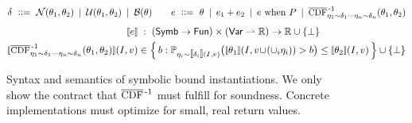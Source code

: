 \begin{figure}
  \EquationsFigureSize
  \begin{gather*}
    \delta \BnfDef \slnormal(\theta_1, \theta_2) \BnfOr \sluniform(\theta_1, \theta_2) \BnfOr \slbernouilli(\theta) \qquad
    e \BnfDef \theta \BnfOr e_1 + e_2 \BnfOr e \WhenSymbBE P  \BnfOr \InvCCDFwith{\eta_1 \sim \delta_1 \cdots \eta_n \sim \delta_n}(\theta_1, \theta_2) %
  \end{gather*}
  \begin{align*}
    \SymbBESem{e} &\aligncolon (\SymbsAll \to \Funs) \times (\VarsAll \parto \Reals) \to \OptReals \\
    \SymbBESem{\InvCCDFwith{\eta_1 \sim \delta_1 \cdots \eta_n \sim \delta_n}(\theta_1, \theta_2)}(I, v) &\in
       \Bigl\{\,b : \Prob_{\eta_i \sim \sem{\delta_i}(I, v)}\bigl(\sem{\theta_1}(I, v \!\CatValuation\! (\CatValuation_i \eta_i)) > b \bigr) \le \sem{\theta_2}(I,v)\,\Bigr\} \cup \{\OptNone\}
  \end{align*}
  \vspace{-0.4cm}
  \caption{Syntax and semantics of symbolic bound instantiations. We only show the contract that $\InvCCDF$ must fulfill for soundness. Concrete implementations must optimize for small, real return values.  }\label{fig:tail-expressions}
  \Description[]{}
\end{figure}
